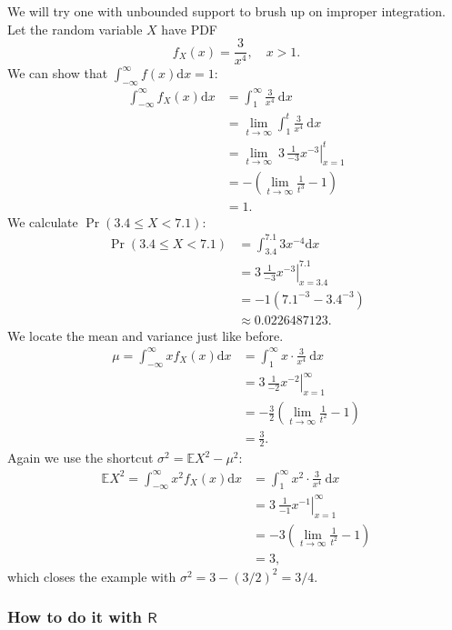 \documentclass[captions=tableheading]{scrbook}
\begin{document}
\begin{example}

We will try one with unbounded support to brush up on improper integration. Let the random variable \(X\) have PDF
\[
f_{X}(x)=\frac{3}{x^{4}},\quad x>1.
\]
We can show that \(\int_{-\infty}^{\infty}f(x)\mathrm{d} x=1\):
\begin{align*}
\int_{-\infty}^{\infty}f_{X}(x)\mathrm{d} x & =\int_{1}^{\infty}\frac{3}{x^{4}}\:\mathrm{d} x\\
 & =\lim_{t\to\infty}\int_{1}^{t}\frac{3}{x^{4}}\:\mathrm{d} x\\
 & =\lim_{t\to\infty}\ \left.3\,\frac{1}{-3}x^{-3}\right|_{x=1}^{t}\\
 & =-\left(\lim_{t\to\infty}\frac{1}{t^{3}}-1\right)\\
 & =1.
\end{align*}
We calculate \(\Pr(3.4\leq X<7.1)\):
\begin{align*}
\Pr(3.4\leq X<7.1) & =\int_{3.4}^{7.1}3x^{-4}\mathrm{d} x\\
 & =\left.3\,\frac{1}{-3}x^{-3}\right|_{x=3.4}^{7.1}\\
 & =-1(7.1^{-3}-3.4^{-3})\\
 & \approx0.0226487123.
\end{align*}
We locate the mean and variance just like before.
\begin{align*}
\mu=\int_{-\infty}^{\infty}xf_{X}(x)\mathrm{d} x & =\int_{1}^{\infty}x\cdot\frac{3}{x^{4}}\:\mathrm{d} x\\
 & =\left.3\,\frac{1}{-2}x^{-2}\right|_{x=1}^{\infty}\\
 & =-\frac{3}{2}\left(\lim_{t\to\infty}\frac{1}{t^{2}}-1\right)\\
 & =\frac{3}{2}.
\end{align*}
Again we use the shortcut \(\sigma^{2}=\mathbb{E} X^{2}-\mu^{2}\):
\begin{align*}
\mathbb{E} X^{2}=\int_{-\infty}^{\infty}x^{2}f_{X}(x)\mathrm{d} x & =\int_{1}^{\infty}x^{2}\cdot\frac{3}{x^{4}}\:\mathrm{d} x\\
 & =\left.3\:\frac{1}{-1}x^{-1}\right|_{x=1}^{\infty}\\
 & =-3\left(\lim_{t\to\infty}\frac{1}{t^{2}}-1\right)\\
 & =3,
\end{align*}
which closes the example with \(\sigma^{2}=3-(3/2)^{2}=3/4\).
\end{example}
\subsubsection{How to do it with \(\mathsf{R}\)}
\label{sec-6-1-2-1}
\end{document}
